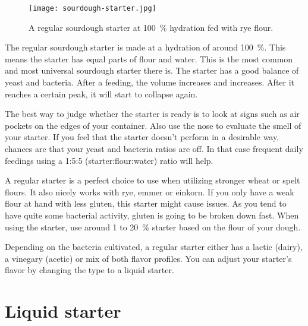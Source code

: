 \begin{figure}[!htb]
  \texttt{[image: sourdough-starter.jpg]}
  \caption[Regular starter]{A regular sourdough starter at \qty{100}{\percent}
      hydration fed with rye flour.}%
  \label{fig:regular-sourdough-starter}
\end{figure}

The regular sourdough starter is made at a hydration of around \qty{100}{\percent}.
This means the starter has equal parts of flour and water. This is the most
common and most universal sourdough starter there is. The starter has a good
balance of yeast and bacteria. After a feeding, the volume increases and
increases. After it reaches a certain peak, it will start to collapse again.

The best way to judge whether the starter is ready is to look at signs such as
air pockets on the edges of your container. Also use the nose to evaluate the
smell of your starter. If you feel that the starter doesn't perform in a
desirable way, chances are that your yeast and bacteria ratios are off. In that
case frequent daily feedings using a 1:5:5 (starter:flour:water) ratio will
help.

A regular starter is a perfect choice to use when utilizing stronger wheat or spelt flours.
It also nicely works with rye, emmer or einkorn. If you only have a weak flour
at hand with less gluten, this starter might cause issues. As you tend to have
quite some bacterial activity, gluten is going to be broken down fast. When
using the starter, use around 1 to \qty{20}{\percent} starter based on the flour of your
dough.

Depending on the bacteria cultivated, a regular starter either has a lactic (dairy),
a vinegary (acetic) or mix of both flavor profiles. You can adjust your
starter's flavor by changing the type to a liquid starter.

\section{Liquid starter}%
\label{section:liquid-starter}

